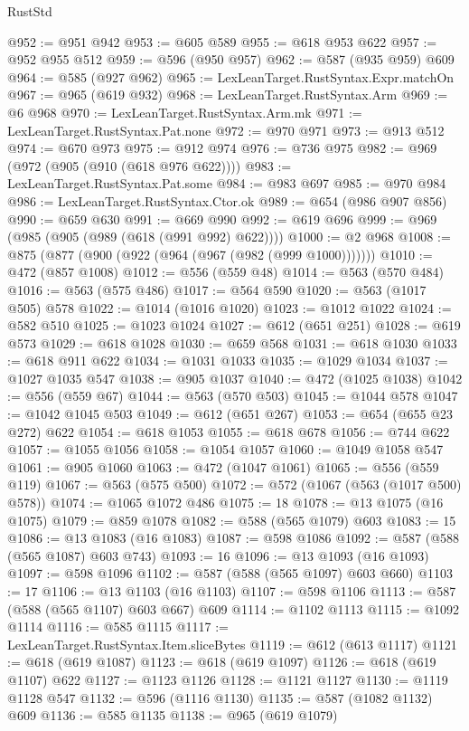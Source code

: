 \begin{lexlean}{RustStd}
\begin{coremodule}
@952 := @951 @942
@953 := @605 @589
@955 := @618 @953 @622
@957 := @952 @955 @512
@959 := @596 (@950 @957)
@962 := @587 (@935 @959) @609
@964 := @585 (@927 @962)
@965 := LexLeanTarget.RustSyntax.Expr.matchOn
@967 := @965 (@619 @932)
@968 := LexLeanTarget.RustSyntax.Arm
@969 := @6 @968
@970 := LexLeanTarget.RustSyntax.Arm.mk
@971 := LexLeanTarget.RustSyntax.Pat.none
@972 := @970 @971
@973 := @913 @512
@974 := @670 @973
@975 := @912 @974
@976 := @736 @975
@982 := @969 (@972 (@905 (@910 (@618 @976 @622))))
@983 := LexLeanTarget.RustSyntax.Pat.some
@984 := @983 @697
@985 := @970 @984
@986 := LexLeanTarget.RustSyntax.Ctor.ok
@989 := @654 (@986 @907 @856)
@990 := @659 @630
@991 := @669 @990
@992 := @619 @696
@999 := @969 (@985 (@905 (@989 (@618 (@991 @992) @622))))
@1000 := @2 @968
@1008 := @875 (@877 (@900 (@922 (@964 (@967 (@982 (@999 @1000)))))))
@1010 := @472 (@857 @1008)
@1012 := @556 (@559 @48)
@1014 := @563 (@570 @484)
@1016 := @563 (@575 @486)
@1017 := @564 @590
@1020 := @563 (@1017 @505) @578
@1022 := @1014 (@1016 @1020)
@1023 := @1012 @1022
@1024 := @582 @510
@1025 := @1023 @1024
@1027 := @612 (@651 @251)
@1028 := @619 @573
@1029 := @618 @1028
@1030 := @659 @568
@1031 := @618 @1030
@1033 := @618 @911 @622
@1034 := @1031 @1033
@1035 := @1029 @1034
@1037 := @1027 @1035 @547
@1038 := @905 @1037
@1040 := @472 (@1025 @1038)
@1042 := @556 (@559 @67)
@1044 := @563 (@570 @503)
@1045 := @1044 @578
@1047 := @1042 @1045 @503
@1049 := @612 (@651 @267)
@1053 := @654 (@655 @23 @272) @622
@1054 := @618 @1053
@1055 := @618 @678
@1056 := @744 @622
@1057 := @1055 @1056
@1058 := @1054 @1057
@1060 := @1049 @1058 @547
@1061 := @905 @1060
@1063 := @472 (@1047 @1061)
@1065 := @556 (@559 @119)
@1067 := @563 (@575 @500)
@1072 := @572 (@1067 (@563 (@1017 @500) @578))
@1074 := @1065 @1072 @486
@1075 := 18
@1078 := @13 @1075 (@16 @1075)
@1079 := @859 @1078
@1082 := @588 (@565 @1079) @603
@1083 := 15
@1086 := @13 @1083 (@16 @1083)
@1087 := @598 @1086
@1092 := @587 (@588 (@565 @1087) @603 @743)
@1093 := 16
@1096 := @13 @1093 (@16 @1093)
@1097 := @598 @1096
@1102 := @587 (@588 (@565 @1097) @603 @660)
@1103 := 17
@1106 := @13 @1103 (@16 @1103)
@1107 := @598 @1106
@1113 := @587 (@588 (@565 @1107) @603 @667) @609
@1114 := @1102 @1113
@1115 := @1092 @1114
@1116 := @585 @1115
@1117 := LexLeanTarget.RustSyntax.Item.sliceBytes
@1119 := @612 (@613 @1117)
@1121 := @618 (@619 @1087)
@1123 := @618 (@619 @1097)
@1126 := @618 (@619 @1107) @622
@1127 := @1123 @1126
@1128 := @1121 @1127
@1130 := @1119 @1128 @547
@1132 := @596 (@1116 @1130)
@1135 := @587 (@1082 @1132) @609
@1136 := @585 @1135
@1138 := @965 (@619 @1079)

\end{coremodule}
\end{lexlean}
